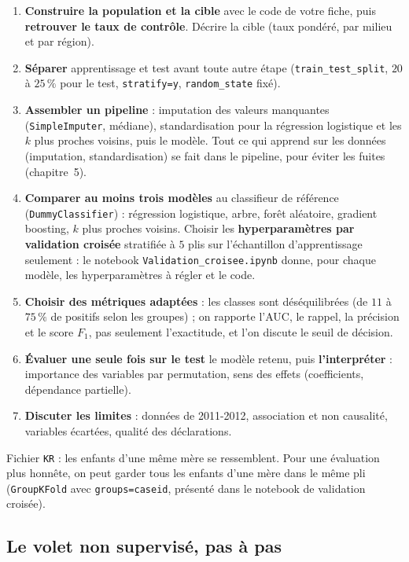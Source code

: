 \documentclass[11pt]{article}
\begin{document}
\begin{enumerate}
  \item \textbf{Construire la population et la cible} avec le code de votre fiche, puis \textbf{retrouver le taux de contrôle}. Décrire la cible (taux pondéré, par milieu et par région).
  \item \textbf{Séparer} apprentissage et test avant toute autre étape (\texttt{train\_test\_split}, $20$ à $25\,\%$ pour le test, \texttt{stratify=y}, \texttt{random\_state} fixé).
  \item \textbf{Assembler un pipeline} : imputation des valeurs manquantes (\texttt{SimpleImputer}, médiane), standardisation pour la régression logistique et les $k$ plus proches voisins, puis le modèle. Tout ce qui apprend sur les données (imputation, standardisation) se fait dans le pipeline, pour éviter les fuites (chapitre~5).
  \item \textbf{Comparer au moins trois modèles} au classifieur de référence (\texttt{DummyClassifier}) : régression logistique, arbre, forêt aléatoire, gradient boosting, $k$ plus proches voisins. Choisir les \textbf{hyperparamètres par validation croisée} stratifiée à $5$ plis sur l'échantillon d'apprentissage seulement : le notebook \texttt{Validation\_croisee.ipynb} donne, pour chaque modèle, les hyperparamètres à régler et le code.
  \item \textbf{Choisir des métriques adaptées} : les classes sont déséquilibrées (de $11$ à $75\,\%$ de positifs selon les groupes) ; on rapporte l'AUC, le rappel, la précision et le score $F_1$, pas seulement l'exactitude, et l'on discute le seuil de décision.
  \item \textbf{Évaluer une seule fois sur le test} le modèle retenu, puis \textbf{l'interpréter} : importance des variables par permutation, sens des effets (coefficients, dépendance partielle).
  \item \textbf{Discuter les limites} : données de 2011-2012, association et non causalité, variables écartées, qualité des déclarations.
\end{enumerate}
{\small\color{cnfGris}Fichier \texttt{KR} : les enfants d'une même mère se ressemblent. Pour une évaluation plus honnête, on peut garder tous les enfants d'une mère dans le même pli (\texttt{GroupKFold} avec \texttt{groups=caseid}, présenté dans le notebook de validation croisée).}

\subsection{Le volet non supervisé, pas à pas}
\end{document}
